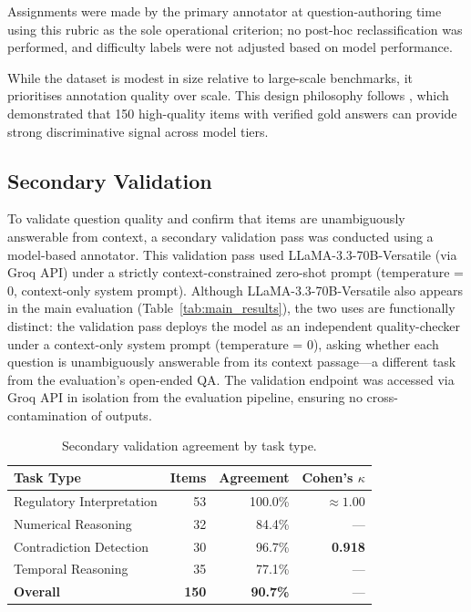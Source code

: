 \documentclass[11pt]{article}
\begin{document}
Assignments were made by the primary annotator at question-authoring time using
this rubric as the sole operational criterion; no post-hoc reclassification was
performed, and difficulty labels were not adjusted based on model performance.

While the dataset is modest in size relative to large-scale benchmarks, it
prioritises annotation quality over scale. This design philosophy follows
\citet{islam2023financebench}, which demonstrated that 150 high-quality items
with verified gold answers can provide strong discriminative signal across model
tiers.

\subsection{Secondary Validation}

To validate question quality and confirm that items are unambiguously answerable
from context, a secondary validation pass was conducted using a model-based
annotator. This validation pass used LLaMA-3.3-70B-Versatile (via Groq API)
under a strictly context-constrained zero-shot prompt (temperature = 0,
context-only system prompt). Although LLaMA-3.3-70B-Versatile also appears in
the main evaluation (Table~\ref{tab:main_results}), the two uses are
functionally distinct: the validation pass deploys the model as an independent
quality-checker under a context-only system prompt (temperature = 0), asking
whether each question is unambiguously answerable from its context
passage---a different task from the evaluation's open-ended QA. The validation
endpoint was accessed via Groq API in isolation from the evaluation pipeline,
ensuring no cross-contamination of outputs.

\begin{table}[h]
\centering
\caption{Secondary validation agreement by task type.}
\label{tab:validation}
\begin{tabular}{lrrr}
\toprule
\textbf{Task Type} & \textbf{Items} & \textbf{Agreement} & \textbf{Cohen's $\kappa$} \\
\midrule
Regulatory Interpretation & 53 & 100.0\% & ${\approx}1.00$ \\
Numerical Reasoning       & 32 &  84.4\% & --- \\
Contradiction Detection   & 30 &  96.7\% & \textbf{0.918} \\
Temporal Reasoning        & 35 &  77.1\% & --- \\
\midrule
\textbf{Overall} & \textbf{150} & \textbf{90.7\%} & --- \\
\bottomrule
\end{tabular}
\end{table}
\end{document}
